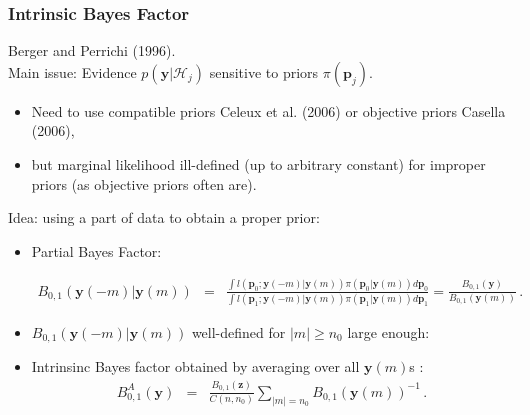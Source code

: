 \documentclass[nopagenumber,9pt]{beamer}
\newcommand{\bs}{\boldsymbol}
\newcommand{\blue}{\textcolor{myblue}}
\begin{document}
\begin{frame}
 \frametitle{Intrinsic Bayes Factor}
 
 {\color{blue} Berger and Perrichi (1996)}.\\
 
 \medskip
{{ Main issue:}} Evidence $p(\bs y|\mathcal{H}_j)${ sensitive to priors} $\pi(\bs p_j)$.

\begin{itemize}
\item Need to use { compatible priors} {\color{blue} Celeux et al. (2006)} or { objective priors} {\color{blue} Casella (2006)}, 
\item but marginal likelihood {{ ill-defined}} (up to arbitrary constant) for {{ improper priors}} (as {{ objective priors}} often are).
\end{itemize}


\blue{Idea:} using a part of data to obtain a proper prior:

\begin{itemize}
 \item Partial Bayes Factor:



\begin{eqnarray*}\label{eq:partialBF}
B_{0,1}(\bs y(-m)|\bs y(m)) 
&=& 
\frac{\int l(\bs p_0 ;\bs y(-m)|\bs y(m)) \pi(\bs p_0|\bs y(m))d\bs p_0}{\int l(\bs p_1 ;\bs y(-m)|\bs y(m)) \pi(\bs p_1|\bs y(m))d\bs p_1}
=
\frac
{B_{0,1}(\bs y)}
{B_{0,1}(\bs y(m))}\,.
\end{eqnarray*}
\item $B_{0,1}(\bs y(-m)|\bs y(m))$ {\blue{ well-defined}} for $|m|\geq n_0$ large enough:

\item { Intrinsinc Bayes factor} obtained by averaging over all $\bs y(m)$s :
\begin{eqnarray*}\label{eq:AIF}
B_{0,1}^A(\bs y) &=& \frac{B_{0,1}(\bs z)}{C(n,n_0)} \sum_{|m|=n_0} B_{0,1}(\bs y(m))^{-1} \,.
\end{eqnarray*}
\end{itemize}

 
\end{frame}
\end{document}
